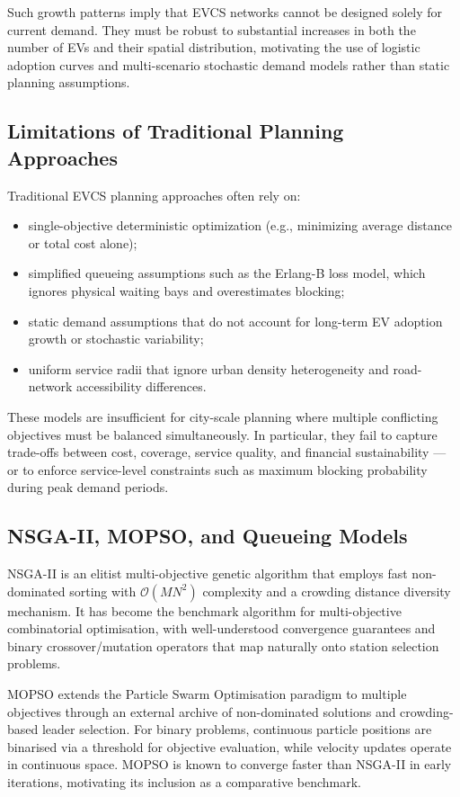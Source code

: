 Such growth patterns imply that EVCS networks cannot be designed solely
for current demand. They must be robust to substantial increases in both
the number of EVs and their spatial distribution, motivating the use of
logistic adoption curves and multi-scenario stochastic demand models rather
than static planning assumptions.

\subsection{Limitations of Traditional Planning Approaches}

Traditional EVCS planning approaches often rely on:
\begin{itemize}
  \item single-objective deterministic optimization (e.g., minimizing
        average distance or total cost alone);
  \item simplified queueing assumptions such as the Erlang-B loss model,
        which ignores physical waiting bays and overestimates blocking;
  \item static demand assumptions that do not account for long-term
        EV adoption growth or stochastic variability;
  \item uniform service radii that ignore urban density heterogeneity
        and road-network accessibility differences.
\end{itemize}
These models are insufficient for city-scale planning where multiple
conflicting objectives must be balanced simultaneously. In particular,
they fail to capture trade-offs between cost, coverage, service quality,
and financial sustainability --- or to enforce service-level constraints
such as maximum blocking probability during peak demand periods.

\subsection{NSGA-II, MOPSO, and Queueing Models}

NSGA-II is an elitist multi-objective genetic algorithm that employs
fast non-dominated sorting with $\mathcal{O}(MN^2)$ complexity and a
crowding distance diversity mechanism. It has become the benchmark
algorithm for multi-objective combinatorial optimisation, with
well-understood convergence guarantees and binary crossover/mutation
operators that map naturally onto station selection problems.

MOPSO extends the Particle Swarm Optimisation paradigm to multiple
objectives through an external archive of non-dominated solutions and
crowding-based leader selection. For binary problems, continuous particle
positions are binarised via a threshold for objective evaluation, while
velocity updates operate in continuous space. MOPSO is known to converge
faster than NSGA-II in early iterations, motivating its inclusion as a
comparative benchmark.

